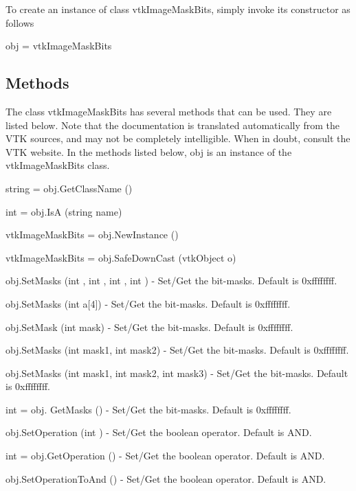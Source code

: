To create an instance of class vtk\-Image\-Mask\-Bits, simply invoke its constructor as follows \begin{DoxyVerb}  obj = vtkImageMaskBits
\end{DoxyVerb}
 \hypertarget{vtkwidgets_vtkxyplotwidget_Methods}{}\subsection{Methods}\label{vtkwidgets_vtkxyplotwidget_Methods}
The class vtk\-Image\-Mask\-Bits has several methods that can be used. They are listed below. Note that the documentation is translated automatically from the V\-T\-K sources, and may not be completely intelligible. When in doubt, consult the V\-T\-K website. In the methods listed below, {\ttfamily obj} is an instance of the vtk\-Image\-Mask\-Bits class. 
\begin{DoxyItemize}
\item {\ttfamily string = obj.\-Get\-Class\-Name ()}  
\item {\ttfamily int = obj.\-Is\-A (string name)}  
\item {\ttfamily vtk\-Image\-Mask\-Bits = obj.\-New\-Instance ()}  
\item {\ttfamily vtk\-Image\-Mask\-Bits = obj.\-Safe\-Down\-Cast (vtk\-Object o)}  
\item {\ttfamily obj.\-Set\-Masks (int , int , int , int )} -\/ Set/\-Get the bit-\/masks. Default is 0xffffffff.  
\item {\ttfamily obj.\-Set\-Masks (int a\mbox{[}4\mbox{]})} -\/ Set/\-Get the bit-\/masks. Default is 0xffffffff.  
\item {\ttfamily obj.\-Set\-Mask (int mask)} -\/ Set/\-Get the bit-\/masks. Default is 0xffffffff.  
\item {\ttfamily obj.\-Set\-Masks (int mask1, int mask2)} -\/ Set/\-Get the bit-\/masks. Default is 0xffffffff.  
\item {\ttfamily obj.\-Set\-Masks (int mask1, int mask2, int mask3)} -\/ Set/\-Get the bit-\/masks. Default is 0xffffffff.  
\item {\ttfamily int = obj. Get\-Masks ()} -\/ Set/\-Get the bit-\/masks. Default is 0xffffffff.  
\item {\ttfamily obj.\-Set\-Operation (int )} -\/ Set/\-Get the boolean operator. Default is A\-N\-D.  
\item {\ttfamily int = obj.\-Get\-Operation ()} -\/ Set/\-Get the boolean operator. Default is A\-N\-D.  
\item {\ttfamily obj.\-Set\-Operation\-To\-And ()} -\/ Set/\-Get the boolean operator. Default is A\-N\-D.  

\end{DoxyItemize}
